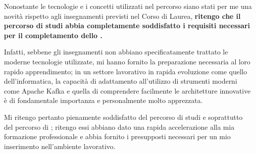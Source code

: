 Nonostante le tecnologie e i concetti utilizzati nel percorso siano stati per me una novità rispetto agli insegnamenti previsti nel Corso di Laurea, \textbf{ritengo che il percorso di studi abbia completamente soddisfatto i requisiti necessari per il completamento dello \stage.}

Infatti, sebbene gli insegnamenti non abbiano specificatamente trattato le moderne tecnologie utilizzate, mi hanno fornito la preparazione necessaria al loro  rapido apprendimento; in un settore lavorativo in rapida evoluzione come quello dell'informatica, la capacità di adattamento all'utilizzo di strumenti moderni come Apache Kafka e quella di comprendere facilmente le architetture innovative è di fondamentale importanza e personalmente molto apprezzata.

Mi ritengo pertanto pienamente soddisfatto del percorso di studi e soprattutto del percorso di \stage; ritengo essi abbiano dato una rapida accelerazione alla mia formazione professionale e abbia fornito i presupposti necessari per un mio inserimento nell'ambiente lavorativo.


